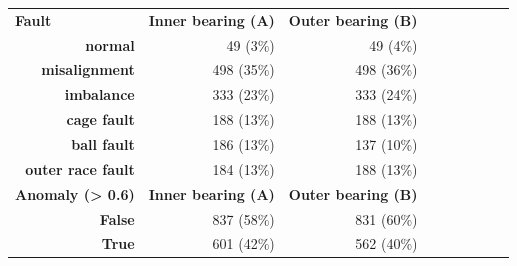 \begin{table}[ht]
\centering
\renewcommand{\arraystretch}{1.2}
\begin{tabular}{rrrrrllll}
\cline{1-3}
\multicolumn{1}{|l|}{\textbf{Fault}}                                                                                          & \multicolumn{1}{l|}{\textbf{Inner bearing (A)}} & \multicolumn{1}{l|}{\textbf{Outer bearing (B)}} \\ \cline{1-3}
\multicolumn{1}{|r|}{\textbf{normal}}                 & \multicolumn{1}{r|}{49 (3\%)}                   & \multicolumn{1}{r|}{49 (4\%)}                    \\ \cline{1-3}
\multicolumn{1}{|r|}{\textbf{misalignment}}           & \multicolumn{1}{r|}{498 (35\%)}                 & \multicolumn{1}{r|}{498 (36\%)}                  \\ \cline{1-3}
\multicolumn{1}{|r|}{\textbf{imbalance}}              & \multicolumn{1}{r|}{333 (23\%)}                 & \multicolumn{1}{r|}{333 (24\%)}                  \\ \cline{1-3}
\multicolumn{1}{|r|}{\textbf{cage fault}}             & \multicolumn{1}{r|}{188 (13\%)}                 & \multicolumn{1}{r|}{188 (13\%)}                  \\ \cline{1-3}
\multicolumn{1}{|r|}{\textbf{ball fault}}             & \multicolumn{1}{r|}{186 (13\%)}                 & \multicolumn{1}{r|}{137 (10\%)}                  \\ \cline{1-3}
\multicolumn{1}{|r|}{\textbf{outer race fault}}       & \multicolumn{1}{r|}{184 (13\%)}                 & \multicolumn{1}{r|}{188 (13\%)}                  \\ \cline{1-3}

\multicolumn{1}{|l|}{\textbf{Anomaly (> 0.6)}}                                                                                          & \multicolumn{1}{l|}{\textbf{Inner bearing (A)}} & \multicolumn{1}{l|}{\textbf{Outer bearing (B)}} \\ \cline{1-3}
\multicolumn{1}{|r|}{\textbf{False}}                                                                            & \multicolumn{1}{r|}{837 (58\%)}                 & \multicolumn{1}{r|}{831 (60\%)}          \\ \cline{1-3}
\multicolumn{1}{|r|}{\textbf{True}}                                                                             & \multicolumn{1}{r|}{601 (42\%)}                 & \multicolumn{1}{r|}{562 (40\%)}          \\ \cline{1-3}


\end{tabular}
\end{table}
